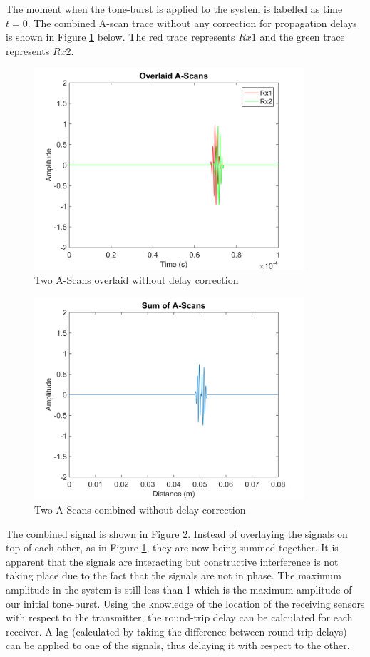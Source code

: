 The moment when the tone-burst is applied to the system is labelled as time $t=0$. The combined A-scan trace without any correction for propagation delays is shown in Figure \ref{fig:cafi_isotropic1} below. The red trace represents $Rx1$ and the green trace represents $Rx2$.

\begin{figure}[htb]
\centering
		\includegraphics[width=100mm]{Isotropic_1.png}
		\caption{Two A-Scans overlaid without delay correction}
		\label{fig:cafi_isotropic1}
\end{figure}

\begin{figure}[htb]
\centering
		\includegraphics[width=100mm]{Isotropic_2.png}
		\caption{Two A-Scans combined without delay correction}
		\label{fig:cafi_isotropic2}
\end{figure}

The combined signal is shown in Figure \ref{fig:cafi_isotropic2}. Instead of overlaying the signals on top of each other, as in Figure \ref{fig:cafi_isotropic1}, they are now being summed together. It is apparent that the signals are interacting but constructive interference is not taking place due to the fact that the signals are not in phase. The maximum amplitude in the system is still less than 1 which is the maximum amplitude of our initial tone-burst. Using the knowledge of the location of the receiving sensors with respect to the transmitter, the round-trip delay can be calculated for each receiver. A lag (calculated by taking the difference between round-trip delays) can be applied to one of the signals, thus delaying it with respect to the other.

